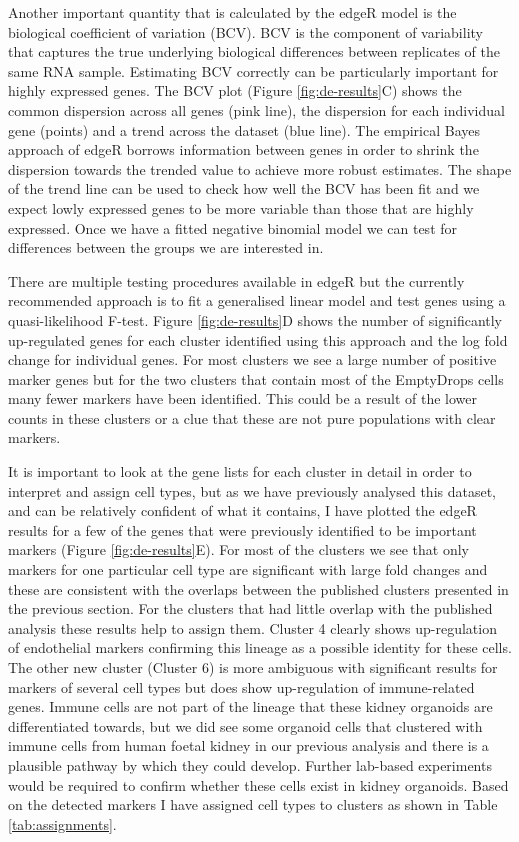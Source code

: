 \documentclass[11pt,a4paper,titlepage,twoside,openright]{style/unimelbthesis}
\theoremstyle{definition}
\theoremstyle{definition}
\theoremstyle{definition}
\theoremstyle{remark}
\begin{document}
\begin{mainmatter}
Another important quantity that is calculated by the edgeR model is the biological coefficient of variation (BCV). BCV is the component of variability that captures the true underlying biological differences between replicates of the same RNA sample. Estimating BCV correctly can be particularly important for highly expressed genes. The BCV plot (Figure \ref{fig:de-results}C) shows the common dispersion across all genes (pink line), the dispersion for each individual gene (points) and a trend across the dataset (blue line). The empirical Bayes approach of edgeR borrows information between genes in order to shrink the dispersion towards the trended value to achieve more robust estimates. The shape of the trend line can be used to check how well the BCV has been fit and we expect lowly expressed genes to be more variable than those that are highly expressed. Once we have a fitted negative binomial model we can test for differences between the groups we are interested in.

There are multiple testing procedures available in edgeR but the currently recommended approach is to fit a generalised linear model and test genes using a quasi-likelihood F-test. Figure \ref{fig:de-results}D shows the number of significantly up-regulated genes for each cluster identified using this approach and the log fold change for individual genes. For most clusters we see a large number of positive marker genes but for the two clusters that contain most of the EmptyDrops cells many fewer markers have been identified. This could be a result of the lower counts in these clusters or a clue that these are not pure populations with clear markers.

It is important to look at the gene lists for each cluster in detail in order to interpret and assign cell types, but as we have previously analysed this dataset, and can be relatively confident of what it contains, I have plotted the edgeR results for a few of the genes that were previously identified to be important markers (Figure \ref{fig:de-results}E). For most of the clusters we see that only markers for one particular cell type are significant with large fold changes and these are consistent with the overlaps between the published clusters presented in the previous section. For the clusters that had little overlap with the published analysis these results help to assign them. Cluster 4 clearly shows up-regulation of endothelial markers confirming this lineage as a possible identity for these cells. The other new cluster (Cluster 6) is more ambiguous with significant results for markers of several cell types but does show up-regulation of immune-related genes. Immune cells are not part of the lineage that these kidney organoids are differentiated towards, but we did see some organoid cells that clustered with immune cells from human foetal kidney in our previous analysis and there is a plausible pathway by which they could develop. Further lab-based experiments would be required to confirm whether these cells exist in kidney organoids. Based on the detected markers I have assigned cell types to clusters as shown in Table \ref{tab:assignments}.


\end{mainmatter}
\end{document}
